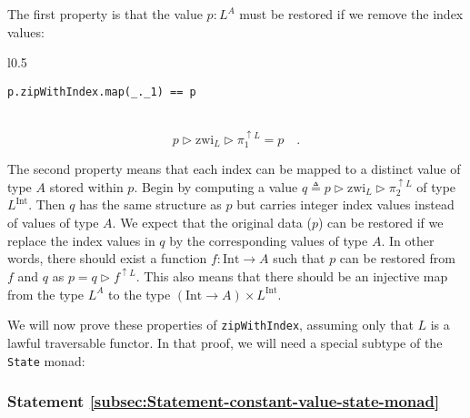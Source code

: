 The first property is that the value $p:L^{A}$ must be restored if
we remove the index values:

\begin{wrapfigure}{l}{0.5\columnwidth}%
\vspace{-1\baselineskip}
\begin{lstlisting}
p.zipWithIndex.map(_._1) == p
\end{lstlisting}
\vspace{-0.5\baselineskip}
\end{wrapfigure}%

~\vspace{-0.5\baselineskip}
\[
p\triangleright\text{zwi}_{L}\triangleright\pi_{1}^{\uparrow L}=p\quad.
\]

The second property means that each index can be mapped to a distinct
value of type $A$ stored within $p$. Begin by computing a value
$q\triangleq p\triangleright\text{zwi}_{L}\triangleright\pi_{2}^{\uparrow L}$
of type $L^{\text{Int}}$. Then $q$ has the same structure as $p$
but carries integer index values instead of values of type $A$. We
expect that the original data ($p$) can be restored if we replace
the index values in $q$ by the corresponding values of type $A$.
In other words, there should exist a function $f:\text{Int}\rightarrow A$
such that $p$ can be restored from $f$ and $q$ as $p=q\triangleright f^{\uparrow L}$.
This also means that there should be an injective map from the type
$L^{A}$ to the type $(\text{Int}\rightarrow A)\times L^{\text{Int}}$.

We will now prove these properties of \lstinline!zipWithIndex!, assuming
only that $L$ is a lawful traversable functor. In that proof, we
will need a special subtype of the \lstinline!State! monad:

\subsubsection{Statement \label{subsec:Statement-constant-value-state-monad}\ref{subsec:Statement-constant-value-state-monad}}

